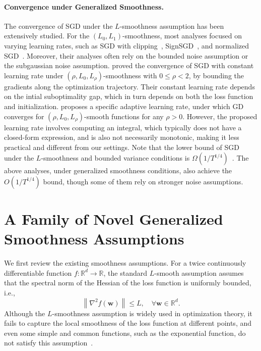 \documentclass{article}
\newcommand{\Norm}[1]{\left\|#1\right\|}
\newcommand{\bw}{\mathbf{w}}
\newcommand{\RR}{\mathbb{R}}
\begin{document}
\paragraph{Convergence under Generalized Smoothness.}
The convergence of SGD under the $L$-smoothness assumption has been extensively studied. For the $(L_0,L_1)$-smoothness, most analyses focused on varying learning rates, such as SGD with clipping~\citep{zhang2020gradient, zhang2020improved, qian2021understanding}, SignSGD~\citep{crawshaw2022robustness}, and normalized SGD~\citep{zhao2021convergence}.
Moreover, their analyses often rely on the bounded noise assumption or the subgaussian noise assumption. \cite{li2023convex} proved the convergence of SGD with constant learning rate under $(\rho,L_0,L_\rho)$-smoothness with $0\leq\rho<2$, by bounding the gradients along the optimization trajectory. Their constant learning rate depends on the intial suboptimality gap, which in turn depends on both the loss function and initialization. 
\citet{tyurin2025toward} proposes a specific adaptive learning rate, under which GD converges for $(\rho, L_0,L_\rho)$-smooth functions for any $\rho>0$. However, the proposed learning rate involves computing an integral, which typically does not have a closed-form expression, and is also not necessarily monotonic, making it less practical and different from our settings.
Note that the lower bound of SGD under the $L$-smoothness and bounded variance conditions is $\Omega(1/T^{1/4})$~\citep{arjevani2023lower}. The above analyses, under generalized smoothness conditions, also achieve the $O(1/T^{1/4})$ bound, though some of them rely on stronger noise assumptions.




\section{A Family of Novel Generalized Smoothness Assumptions}\label{sec:FamilySmoothness}

We first review the existing smoothness assumptions. For a twice continuously differentiable function $f:\RR^d \to \RR$, the standard $L$-smooth assumption assumes that the spectral norm of the Hessian of the loss function is uniformly bounded, i.e.,
$$\Norm{\nabla^2 f(\bw)}\leq L,\quad \forall \bw\in\mathbb{R}^d.$$
Although the $L$-smoothness assumption is widely used in optimization theory, it fails to capture the local smoothness of the loss function at different points, and even some simple and common functions, such as the exponential function, do not satisfy this assumption~\citep{zhang2020gradient}.
\end{document}
